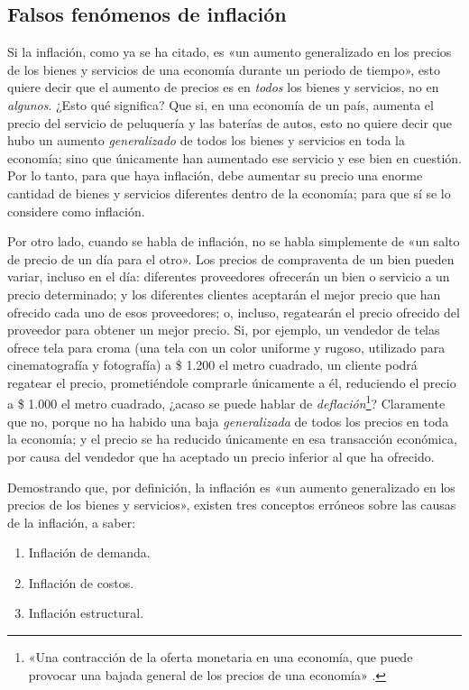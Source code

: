 \documentclass[12pt,a4paper,twoside]{book}
\begin{document}
\subsection{Falsos fenómenos de inflación}
Si la inflación, como ya se ha citado, es «un aumento generalizado en los precios de los bienes y servicios de una economía durante un periodo de tiempo», esto quiere decir que el aumento de precios es en \textit{todos} los bienes y servicios, no en \textit{algunos}. ¿Esto qué significa? Que si, en una economía de un país, aumenta el precio del servicio de peluquería y las baterías de autos, esto no quiere decir que hubo un aumento \textit{generalizado} de todos los bienes y servicios en toda la economía; sino que únicamente han aumentado ese servicio y ese bien en cuestión. Por lo tanto, para que haya inflación, debe aumentar su precio una enorme cantidad de bienes y servicios diferentes dentro de la economía; para que sí se lo considere como inflación.

Por otro lado, cuando se habla de inflación, no se habla simplemente de «un salto de precio de un día para el otro». Los precios de compraventa de un bien pueden variar, incluso en el día: diferentes proveedores ofrecerán un bien o servicio a un precio determinado; y los diferentes clientes aceptarán el mejor precio que han ofrecido cada uno de esos proveedores; o, incluso, regatearán el precio ofrecido del proveedor para obtener un mejor precio. Si, por ejemplo, un vendedor de telas ofrece tela para croma (una tela con un color uniforme y rugoso, utilizado para cinematografía y fotografía) a \$ 1.200 el metro cuadrado, un cliente podrá regatear el precio, prometiéndole comprarle únicamente a él, reduciendo el precio a \$ 1.000 el metro cuadrado, ¿acaso se puede hablar de \textit{deflación}\footnote{«Una contracción de la oferta monetaria en una economía, que puede provocar una bajada general de los precios de una economía» \cite{epedia:deflac}.}? Claramente que no, porque no ha habido una baja \textit{generalizada} de todos los precios en toda la economía; y el precio se ha reducido únicamente en esa transacción económica, por causa del vendedor que ha aceptado un precio inferior al que ha ofrecido.

Demostrando que, por definición, la inflación es «un aumento generalizado en los precios de los bienes y servicios», existen tres conceptos erróneos sobre las causas de la inflación, a saber:

\begin{enumerate}
\item Inflación de demanda.
\item Inflación de costos.
\item Inflación estructural.
\end{enumerate}
\end{document}
